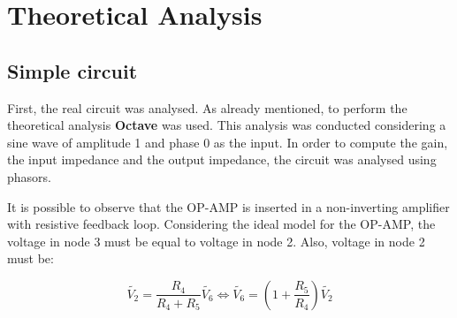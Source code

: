 \newpage
\section{Theoretical Analysis}
\label{sec:analysis}



\subsection{Simple circuit}

First, the real circuit was analysed. As already mentioned, to perform the theoretical analysis {\bf Octave} was used. This analysis was conducted considering a sine wave of amplitude 1 and phase 0 as the input. In order to compute the gain, the input impedance and the output impedance, the circuit was analysed using phasors.

It is possible to observe that the OP-AMP is inserted in a non-inverting amplifier with resistive feedback loop. Considering the ideal model for the OP-AMP, the voltage in node 3 must be equal to voltage in node 2. Also, voltage in node 2 must be:

\begin{equation}
        \widetilde{V_2} = \frac{R_4}{R_4+R_5}\widetilde{V_6} \iff \widetilde{V_6} = (1+\frac{R_5}{R_4})\widetilde{V_2}
\end{equation}

